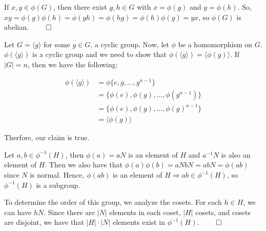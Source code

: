 \documentclass[12pt]{report}
\begin{document}
\sol If $x, y \in \phi(G)$, then there exist $g, h \in G$ with $x = \phi(g)$ and $y=\phi(h)$. So, $xy = \phi(g)\phi(h) = \phi(gh) = \phi(hg) = \phi(h)\phi(g) = yx$, so $\phi(G)$ is abelian. $\qed$

\sol Let $G = \langle g \rangle$ for some $g \in G$, a cyclic group. Now, let $\phi$ be a homomorphism on $G$. $\phi(\langle g \rangle)$ is a cyclic group and we need to show that $\phi(\langle g \rangle) = \langle \phi(g) \rangle$. If $|G| = n$, then we have the following:

\begin{align*}
    \phi(\langle g \rangle) &= \phi\{e, g, \ldots, g^{n-1}\}\\
    &= \{\phi(e), \phi(g), \ldots, \phi(g^{n-1})\} \\
    &= \{\phi(e), \phi(g), \ldots, \phi(g)^{n-1}\} \\
    &= \langle \phi(g) \rangle
\end{align*}

Therfore, our claim is true.

\sol Let $a,b \in \phi^{-1}(H)$, then $\phi(a) = aN$ is an element of $H$ and $a^{-1}N$ is also an element of $H$. Then we also have that $\phi(a)\phi(b) = aNbN = abN = \phi(ab)$ since $N$ is normal. Hence, $\phi(ab)$ is an element of $H \Rightarrow ab \in \phi^{-1}(H)$, so  $\phi^{-1}(H)$ is a subgroup. 

To determine the order of this group, we analyze the cosets. For each $h \in H$, we can have $hN$. Since there are $|N|$ elements in each coset, $|H|$ cosets, and cosets are disjoint, we have that $|H|\cdot|N|$ elements exist in $\phi^{-1}(H)$. $\qed$
\end{document}
